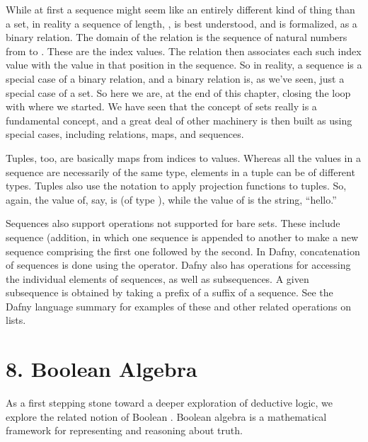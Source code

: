 \documentclass[letterpaper,10pt,english]{sphinxmanual}
\begin{document}
While at first a sequence might seem like an entirely different kind
of thing than a set, in reality a sequence of length, , is best
understood, and is formalized, as a binary relation. The domain of the
relation is the sequence of natural numbers from  to .  These
are the index values. The relation then associates each such index
value with the value in that position in the sequence. So in reality,
a sequence is a special case of a binary relation, and a binary
relation is, as we’ve seen, just a special case of a set.  So here we
are, at the end of this chapter, closing the loop with where we
started. We have seen that the concept of sets really is a fundamental
concept, and a great deal of other machinery is then built as using
special cases, including relations, maps, and sequences.

Tuples, too, are basically maps from indices to values. Whereas all
the values in a sequence are necessarily of the same type, elements in
a tuple can be of different types. Tuples also use the  notation
to apply projection functions to tuples. So, again, the value of, say,
 is  (of type ), while the value of
 is the string, “hello.”

Sequences also support operations not supported for bare sets. These
include sequence  (addition, in which one sequence is
appended to another to make a new sequence comprising the first one
followed by the second. In Dafny, concatenation of sequences is done
using the \sphinxstyleemphasis{+} operator. Dafny also has operations for accessing the
individual elements of sequences, as well as subsequences. A given
subsequence is obtained by taking a prefix of a suffix of a sequence.
See the Dafny language summary for examples of these and other related
operations on lists.


\chapter{8. Boolean Algebra}
\label{\detokenize{08-boolean-algebra::doc}}\label{\detokenize{08-boolean-algebra:boolean-algebra}}
As a first stepping stone toward a deeper exploration of deductive
logic, we explore the related notion of Boolean . Boolean
algebra is a mathematical framework for representing and reasoning
about truth.
\end{document}
